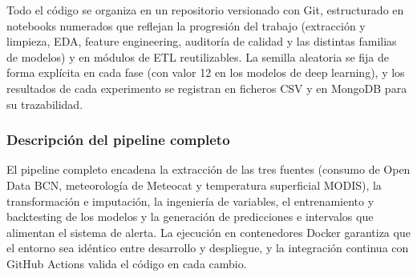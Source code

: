 \documentclass[12pt, a4paper]{article}
\begin{document}
Todo el código se organiza en un repositorio versionado con Git, estructurado en notebooks numerados que reflejan la progresión del trabajo (extracción y limpieza, EDA, feature engineering, auditoría de calidad y las distintas familias de modelos) y en módulos de ETL reutilizables. La semilla aleatoria se fija de forma explícita en cada fase (con valor 12 en los modelos de deep learning), y los resultados de cada experimento se registran en ficheros CSV y en MongoDB para su trazabilidad.

\subsubsection{Descripción del pipeline completo}

El pipeline completo encadena la extracción de las tres fuentes (consumo de Open Data BCN, meteorología de Meteocat y temperatura superficial MODIS), la transformación e imputación, la ingeniería de variables, el entrenamiento y backtesting de los modelos y la generación de predicciones e intervalos que alimentan el sistema de alerta. La ejecución en contenedores Docker garantiza que el entorno sea idéntico entre desarrollo y despliegue, y la integración continua con GitHub Actions valida el código en cada cambio.
\end{document}
